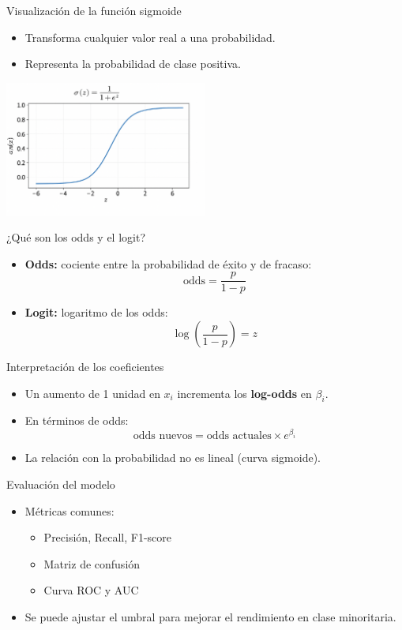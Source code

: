 \documentclass{beamer}
\begin{document}
\begin{frame}{Visualización de la función sigmoide}
\begin{itemize}
    \item Transforma cualquier valor real a una probabilidad.
    \item Representa la probabilidad de clase positiva.
\end{itemize}
\begin{center}
\includegraphics[width=0.5\textwidth]{sigmoid_example.png}
\end{center}
\end{frame}

\begin{frame}{¿Qué son los odds y el logit?}
\begin{itemize}
    \item \textbf{Odds:} cociente entre la probabilidad de éxito y de fracaso:
    \[
    \text{odds} = \frac{p}{1 - p}
    \]
    \item \textbf{Logit:} logaritmo de los odds:
    \[
    \log\left(\frac{p}{1 - p}\right) = z
    \]
\end{itemize}
\end{frame}

\begin{frame}{Interpretación de los coeficientes}
\begin{itemize}
    \item Un aumento de 1 unidad en $x_i$ incrementa los \textbf{log-odds} en $\beta_i$.
    \item En términos de odds:
    \[
    \text{odds nuevos} = \text{odds actuales} \times e^{\beta_i}
    \]
    \item La relación con la probabilidad no es lineal (curva sigmoide).
\end{itemize}
\end{frame}

\begin{frame}{Evaluación del modelo}
\begin{itemize}
    \item Métricas comunes:
    \begin{itemize}
        \item Precisión, Recall, F1-score
        \item Matriz de confusión
        \item Curva ROC y AUC
    \end{itemize}
    \item Se puede ajustar el umbral para mejorar el rendimiento en clase minoritaria.
\end{itemize}
\end{frame}
\end{document}
